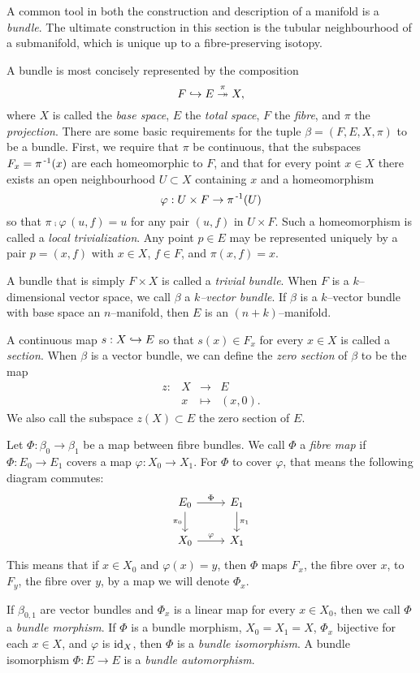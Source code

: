 A common tool in both the construction and description of a manifold is a \emph{bundle}.
The ultimate construction in this section is the tubular neighbourhood of a submanifold, which is unique up to a fibre-preserving isotopy.

\begin{defn}[Bundle]
	A bundle is most concisely represented by the composition
	\[
		F\hookrightarrow E\overset{\pi}{\twoheadrightarrow} X,
	\]
	where $X$ is called the \emph{base space}, $E$ the \emph{total space}, $F$ the \emph{fibre}, and $\pi$ the \emph{projection}.
	There are some basic requirements for the tuple $\beta = (F,E,X,\pi)$ to be a bundle.
	First, we require that $\pi$ be continuous, that the subspaces $F_x = \pi^{\,\text{-}1}(x)$ are each homeomorphic to $F$, and that for every point $x\in X$ there exists an open neighbourhood $U\subset X$ containing $x$ and a homeomorphism
	\[
		\varphi: U\times F\to \pi^{\,\text{-}1}(U)
	\]
	so that $\pi\comp\varphi\,(u,f)=u$ for any pair $(u,f)$ in $U\times F$.
	Such a homeomorphism is called a \emph{local trivialization}.
	Any point $p\in E$ may be represented uniquely by a pair $p=(x,f)$ with $x\in X$, $f\in F$, and $\pi(x,f)=x$.
	
	A bundle that is simply $F\times X$ is called a \emph{trivial bundle}.
	When $F$ is a $k$--dimensional vector space, we call $\beta$ a \emph{$k$--vector bundle}.
	If $\beta$ is a $k$--vector bundle with base space an $n$--manifold, then $E$ is an $(n+k)$--manifold.
	
	A continuous map $s:X\hookrightarrow E$ so that $s(x)\in F_x$ for every $x\in X$ is called a \emph{section}.
	When $\beta$ is a vector bundle, we can define the \emph{zero section} of $\beta$ to be the map
	\[
		\begin{array}{cccc}
			z: & X & \to 	 & E \\
			   & x & \mapsto & (x,0).
		\end{array}
	\]
	We also call the subspace $z(X)\subset E$ the zero section of $E$.
\end{defn}

\begin{defn}
	Let $\Phi:\beta_0\to \beta_1$ be a map between fibre bundles.
	We call $\Phi$ a \emph{fibre map} if $\Phi:E_0\to E_1$ covers a map $\varphi:X_0\to X_1$.
	For $\Phi$ to cover $\varphi$, that means the following diagram commutes:
	\[
		\begin{tikzcd}
			E_0 \arrow{r}{\Phi} \arrow[swap]{d}{\pi_0} & E_1 \arrow{d}{\pi_1} \\
			X_0 \arrow{r}{\varphi} & X_1
		\end{tikzcd}
	\]
	This means that if $x\in X_0$ and $\varphi(x)=y$, then $\Phi$ maps $F_x$, the fibre over $x$, to $F_y$, the fibre over $y$, by a map we will denote $\Phi_x$.

	If $\beta_{0,1}$ are vector bundles and $\Phi_x$ is a linear map for every $x\in X_0$, then we call $\Phi$ a \emph{bundle morphism}.
	If $\Phi$ is a bundle morphism, $X_0=X_1=X$, $\Phi_x$ bijective for each $x\in X$, and $\varphi$ is $\textrm{id}_{X}$, then $\Phi$ is a \emph{bundle isomorphism}.
	A bundle isomorphism $\Phi:E\to E$ is a \emph{bundle automorphism}.
\end{defn}


